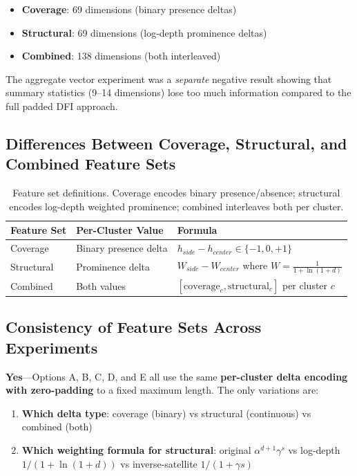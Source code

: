 \documentclass[12pt,a4paper]{article}
\begin{document}
\begin{itemize}
\item \textbf{Coverage}: 69 dimensions (binary presence deltas)
\item \textbf{Structural}: 69 dimensions (log-depth prominence deltas)
\item \textbf{Combined}: 138 dimensions (both interleaved)
\end{itemize}

The aggregate vector experiment was a \textit{separate} negative result showing that summary
statistics (9--14 dimensions) lose too much information compared to the full padded DFI approach.

\subsection{Differences Between Coverage, Structural, and Combined Feature Sets}

\begin{table}[h]
\centering
\begin{tabular}{lll}
\hline
\textbf{Feature Set} & \textbf{Per-Cluster Value} & \textbf{Formula} \\
\hline
Coverage & Binary presence delta & $h_{side} - h_{center} \in \{-1, 0, +1\}$ \\
Structural & Prominence delta & $W_{side} - W_{center}$ where $W = \frac{1}{1+\ln(1+d)}$ \\
Combined & Both values & $[\text{coverage}_c, \text{structural}_c]$ per cluster $c$ \\
\hline
\end{tabular}
\caption{Feature set definitions. Coverage encodes binary presence/absence; structural encodes
log-depth weighted prominence; combined interleaves both per cluster.}
\label{tab:feature_definitions}
\end{table}

\subsection{Consistency of Feature Sets Across Experiments}

\textbf{Yes}---Options A, B, C, D, and E all use the same \textbf{per-cluster delta encoding
with zero-padding} to a fixed maximum length. The only variations are:

\begin{enumerate}
\item \textbf{Which delta type}: coverage (binary) vs structural (continuous) vs combined (both)
\item \textbf{Which weighting formula for structural}: original $\alpha^{d+1}\gamma^s$ vs
      log-depth $1/(1+\ln(1+d))$ vs inverse-satellite $1/(1+\gamma s)$
\end{enumerate}
\end{document}
